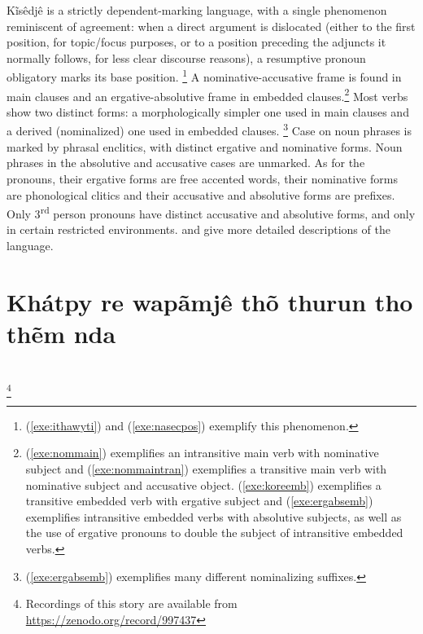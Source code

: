 \documentclass[output=paper,
modfonts,nonflat
]{langsci/langscibook}
\begin{document}
\noindent Kĩsêdjê is a strictly dependent-marking language, with a single
phenomenon reminiscent of agreement: when a direct argument is dislocated
(either to the first position, for topic/focus purposes, or to a position
preceding the adjuncts it normally follows, for less clear discourse reasons),
a resumptive pronoun obligatory marks its base position.%
\footnote{(\ref{exe:ithawyti}) and (\ref{exe:nasecpos}) exemplify this
phenomenon.} A nominative-accusative frame is found in main clauses and an
ergative-absolutive frame in embedded clauses.\footnote{(\ref{exe:nommain})
exemplifies an intransitive main verb with nominative subject and
(\ref{exe:nommaintran}) exemplifies a transitive main verb with nominative
subject and accusative object. (\ref{exe:koreemb}) exemplifies a transitive
embedded verb with ergative subject and (\ref{exe:ergabsemb}) exemplifies
intransitive embedded verbs with absolutive subjects, as well as the use of
ergative pronouns to double the subject of intransitive embedded verbs.} Most
verbs show two distinct forms: a morphologically simpler one used in main
clauses and a derived (nominalized) one used in embedded clauses.%
\footnote{(\ref{exe:ergabsemb}) exemplifies many different nominalizing
suffixes.} Case on noun phrases is marked by phrasal enclitics, with distinct
ergative and nominative forms. Noun phrases in the absolutive and accusative
cases are unmarked. As for the pronouns, their ergative forms are free accented
words, their nominative forms are phonological clitics and their accusative and
absolutive forms are prefixes. Only 3\textsuperscript{rd} person pronouns have
distinct accusative and absolutive forms, and only in certain restricted
environments. \textcite{san97} and \textcite{non14} give more detailed
descriptions of the language.

\newpage 
\section{Khátpy re wapãmjê thõ thurun tho thẽm nda} %
\\

\footnote{Recordings of this story are available from \url{https://zenodo.org/record/997437}}
\end{document}
